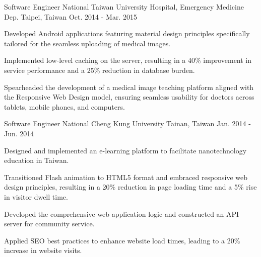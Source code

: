 \begin{cventries}
  \cventry
    {Software Engineer} %
    {National Taiwan University Hospital, Emergency Medicine Dep.} %
    {Taipei, Taiwan} %
    {Oct. 2014 - Mar. 2015} %
    {
      \begin{cvitems} %
        \item {Developed Android applications featuring material design principles specifically tailored for the seamless uploading of medical images.}
        \item {Implemented low-level caching on the server, resulting in a 40\% improvement in service performance and a 25\% reduction in database burden.}
        \item {Spearheaded the development of a medical image teaching platform aligned with the Responsive Web Design model, ensuring seamless usability for doctors across tablets, mobile phones, and computers.}
      \end{cvitems}
    }

  \cventry
    {Software Engineer} %
    {National Cheng Kung University} %
    {Tainan, Taiwan} %
    {Jan. 2014 - Jun. 2014} %
    {
      \begin{cvitems} %
        \item {Designed and implemented an e-learning platform to facilitate nanotechnology education in Taiwan.}
        \item {Transitioned Flash animation to HTML5 format and embraced responsive web design principles, resulting in a 20\% reduction in page loading time and a 5\% rise in visitor dwell time.}
        \item {Developed the comprehensive web application logic and constructed an API server for community service.}
        \item {Applied SEO best practices to enhance website load times, leading to a 20\% increase in website visits.}
      \end{cvitems}
    }

\end{cventries}
